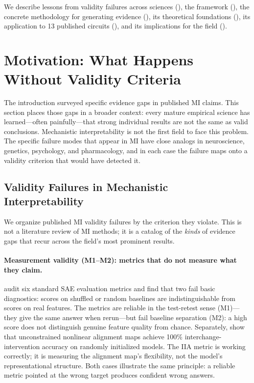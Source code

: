 \documentclass{article}
\begin{document}
We describe lessons from validity failures across sciences (), the framework (), the concrete methodology for generating evidence (), its theoretical foundations (), its application to 13 published circuits (), and its implications for the field ().


\section{Motivation: What Happens Without Validity Criteria}
\label{sec:motivation}

The introduction surveyed specific evidence gaps in published MI claims. This section places those gaps in a broader context: every mature empirical science has learned---often painfully---that strong individual results are not the same as valid conclusions. Mechanistic interpretability is not the first field to face this problem. The specific failure modes that appear in MI have close analogs in neuroscience, genetics, psychology, and pharmacology, and in each case the failure maps onto a validity criterion that would have detected it.

\subsection{Validity Failures in Mechanistic Interpretability}
\label{sec:mi-failures}

We organize published MI validity failures by the criterion they violate. This is not a literature review of MI methods; it is a catalog of the \emph{kinds} of evidence gaps that recur across the field's most prominent results.

\paragraph{Measurement validity (M1--M2): metrics that do not measure what they claim.}
\citet{karvonen2025saebench} audit six standard SAE evaluation metrics and find that two fail basic diagnostics: scores on shuffled or random baselines are indistinguishable from scores on real features. The metrics are reliable in the test-retest sense (M1)---they give the same answer when rerun---but fail baseline separation (M2): a high score does not distinguish genuine feature quality from chance. Separately, \citet{sutter2025nonlinear} show that unconstrained nonlinear alignment maps achieve 100\% interchange-intervention accuracy on randomly initialized models. The IIA metric is working correctly; it is measuring the alignment map's flexibility, not the model's representational structure. Both cases illustrate the same principle: a reliable metric pointed at the wrong target produces confident wrong answers.
\end{document}
